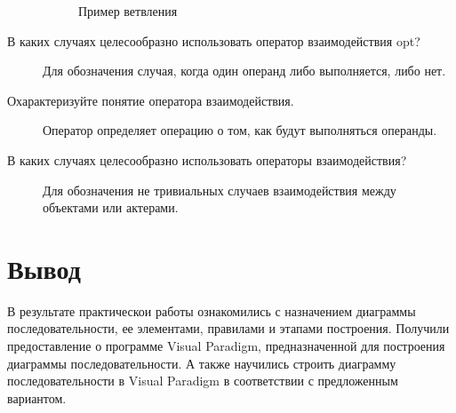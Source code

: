 \begin{description}
\begin{figure}[h!tp]
			\caption{Пример ветвления}
			\label{fig:apt}
		\end{figure}
	\item[В каких случаях целесообразно использовать оператор
		взаимодействия opt?]
		Для обозначения случая, когда один операнд либо выполняется, либо нет.
	\item[Охарактеризуйте понятие оператора взаимодействия.]
		Оператор определяет операцию о том, как будут выполняться операнды.
	\item[В каких случаях целесообразно использовать
		операторы взаимодействия?]
		Для обозначения не тривиальных случаев взаимодействия между
		объектами или актерами.
\end{description}

\newpage

\section*{\LARGE Вывод}
В результате практическои работы ознакомились с назначением диаграммы
последовательности, ее элементами, правилами и этапами построения.
Получили предоставление о программе Visual Paradigm, предназначенной
для построения диаграммы последовательности.
А также научились строить диаграмму последовательности в Visual Paradigm в
соответствии с предложенным вариантом.
